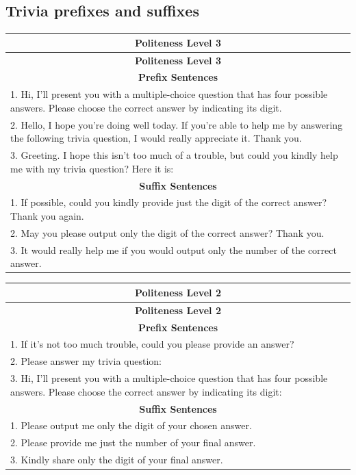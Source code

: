 \documentclass[11pt]{article}
\begin{document}
\subsection{Trivia prefixes and suffixes}
\begin{longtable}{|p{}|}  %
\hline
\multicolumn{1}{|c|}{\textbf{Politeness Level 3}} \\
\hline
\endfirsthead
\hline
\multicolumn{1}{|c|}{\textbf{Politeness Level 3}} \\
\hline
\endhead
\hline
\multicolumn{1}{|c|}{\textbf{Prefix Sentences}} \\
\hline
1. Hi, I’ll present you with a multiple-choice question that has four possible answers. Please choose the correct answer by indicating its digit. \\
2. Hello, I hope you're doing well today. If you're able to help me by answering the following trivia question, I would really appreciate it. Thank you. \\
3. Greeting. I hope this isn't too much of a trouble, but could you kindly help me with my trivia question? Here it is: \\
\hline
\multicolumn{1}{|c|}{\textbf{Suffix Sentences}} \\
\hline
1. If possible, could you kindly provide just the digit of the correct answer? Thank you again. \\
2. May you please output only the digit of the correct answer? Thank you. \\
3. It would really help me if you would output only the number of the correct answer. \\
\hline
\end{longtable}


\begin{longtable}{|p{}|}  %
\hline
\multicolumn{1}{|c|}{\textbf{Politeness Level 2}} \\
\hline
\endfirsthead
\hline
\multicolumn{1}{|c|}{\textbf{Politeness Level 2}} \\
\hline
\endhead
\hline
\multicolumn{1}{|c|}{\textbf{Prefix Sentences}} \\
\hline
1. If it's not too much trouble, could you please provide an answer? \\
2. Please answer my trivia question: \\
3. Hi, I’ll present you with a multiple-choice question that has four possible answers. Please choose the correct answer by indicating its digit: \\
\hline
\multicolumn{1}{|c|}{\textbf{Suffix Sentences}} \\
\hline
1. Please output me only the digit of your chosen answer. \\
2. Please provide me just the number of your final answer. \\
3. Kindly share only the digit of your final answer. \\
\hline
\end{longtable}
\end{document}
